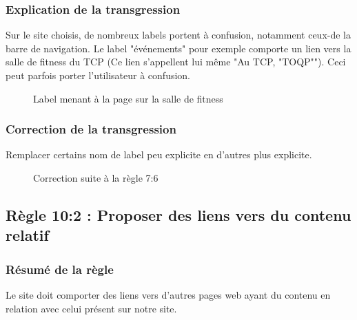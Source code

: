 \documentclass{article}[12pt]
\begin{document}
    \subsubsection*{Explication de la transgression}
    Sur le site choisis, de nombreux labels portent à confusion, notamment ceux-de la barre de navigation. Le label "événements" pour exemple comporte un lien vers la salle de fitness du TCP (Ce lien s'appellent lui même "Au TCP, "TOQP""). Ceci peut parfois porter l'utilisateur à confusion. 
    \begin{figure}[H]
    	\centering
        \caption{Label menant à la page sur la salle de fitness}
    \end{figure}

    \subsubsection*{Correction de la transgression}
    Remplacer certains nom de label peu explicite en d'autres plus explicite.
     \begin{figure}[H]
    	\centering
        \caption{Correction suite à la règle 7:6}
    \end{figure}
  \newpage
    \subsection{Règle 10:2 : Proposer des liens vers du contenu relatif}
    \subsubsection*{Résumé de la règle}
    Le site doit comporter des liens vers d'autres pages web ayant du contenu en relation avec celui présent sur notre site.
\end{document}

